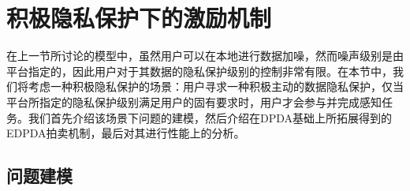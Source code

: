 \section{积极隐私保护下的激励机制}\label{sec:im2}
在上一节所讨论的模型中，虽然用户可以在本地进行数据加噪，然而噪声级别是由平台指定的，因此用户对于其数据的隐私保护级别的控制非常有限。在本节中，我们将考虑一种积极隐私保护的场景：用户寻求一种积极主动的数据隐私保护，仅当平台所指定的隐私保护级别满足用户的固有要求时，用户才会参与并完成感知任务。我们首先介绍该场景下问题的建模，然后介绍在DPDA基础上所拓展得到的EDPDA拍卖机制，最后对其进行性能上的分析。
	
	\subsection{问题建模}
	
